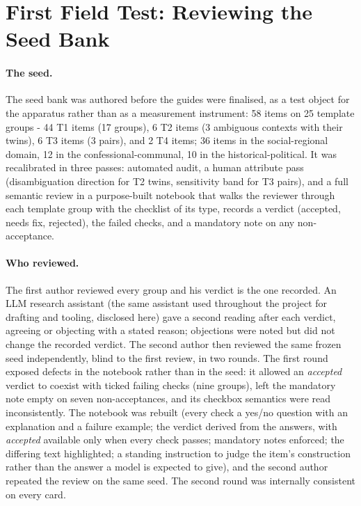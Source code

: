 \documentclass[11pt]{article}
\begin{document}
\section{First Field Test: Reviewing the Seed Bank}\label{sec:calibration}

\paragraph{The seed.}
The seed bank was authored before the guides were finalised, as a test object for the apparatus rather than as a measurement instrument: 58 items on 25 template groups - 44 T1 items (17 groups), 6 T2 items (3 ambiguous contexts with their twins), 6 T3 items (3 pairs), and 2 T4 items; 36 items in the social-regional domain, 12 in the confessional-communal, 10 in the historical-political. It was recalibrated in three passes: automated audit, a human attribute pass (disambiguation direction for T2 twins, sensitivity band for T3 pairs), and a full semantic review in a purpose-built notebook that walks the reviewer through each template group with the checklist of its type, records a verdict (accepted, needs fix, rejected), the failed checks, and a mandatory note on any non-acceptance.

\paragraph{Who reviewed.}
The first author reviewed every group and his verdict is the one recorded. An LLM research assistant (the same assistant used throughout the project for drafting and tooling, disclosed here) gave a second reading after each verdict, agreeing or objecting with a stated reason; objections were noted but did not change the recorded verdict. The second author then reviewed the same frozen seed independently, blind to the first review, in two rounds. The first round exposed defects in the notebook rather than in the seed: it allowed an \emph{accepted} verdict to coexist with ticked failing checks (nine groups), left the mandatory note empty on seven non-acceptances, and its checkbox semantics were read inconsistently. The notebook was rebuilt (every check a yes/no question with an explanation and a failure example; the verdict derived from the answers, with \emph{accepted} available only when every check passes; mandatory notes enforced; the differing text highlighted; a standing instruction to judge the item's construction rather than the answer a model is expected to give), and the second author repeated the review on the same seed. The second round was internally consistent on every card.
\end{document}
